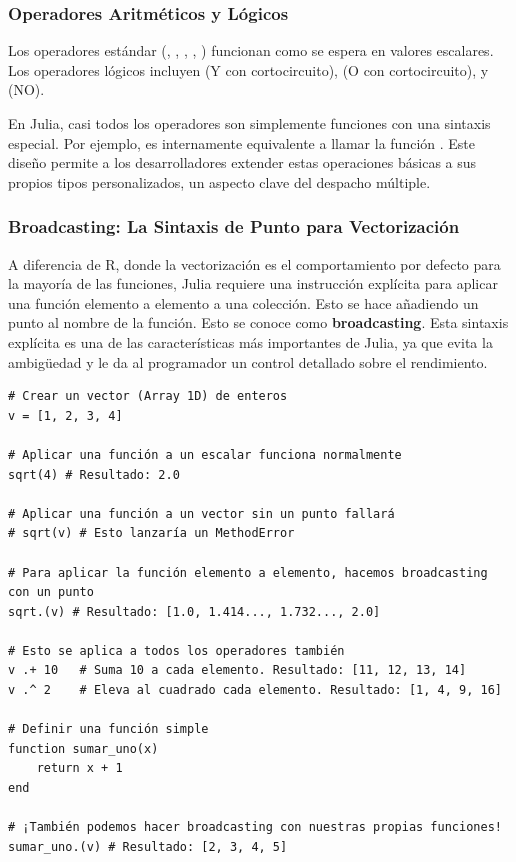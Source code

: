 \subsubsection*{Operadores Aritméticos y Lógicos}
Los operadores estándar (\jcode{+}, \jcode{-}, \jcode{*}, \jcode{/}, \jcode{^}) funcionan como se espera en valores escalares. Los operadores lógicos incluyen \jcode{&&} (Y con cortocircuito), \jcode{||} (O con cortocircuito), y \jcode{!} (NO).

\begin{remark}
En Julia, casi todos los operadores son simplemente funciones con una sintaxis especial. Por ejemplo,  es internamente equivalente a llamar la función . Este diseño permite a los desarrolladores extender estas operaciones básicas a sus propios tipos personalizados, un aspecto clave del despacho múltiple.
\end{remark}

\subsubsection*{Broadcasting: La Sintaxis de Punto para Vectorización}
A diferencia de R, donde la vectorización es el comportamiento por defecto para la mayoría de las funciones, Julia requiere una instrucción explícita para aplicar una función elemento a elemento a una colección. Esto se hace añadiendo un punto  al nombre de la función. Esto se conoce como \textbf{broadcasting}. Esta sintaxis explícita es una de las características más importantes de Julia, ya que evita la ambigüedad y le da al programador un control detallado sobre el rendimiento.

\begin{example}
\text{ }\begin{verbatim}
# Crear un vector (Array 1D) de enteros
v = [1, 2, 3, 4]

# Aplicar una función a un escalar funciona normalmente
sqrt(4) # Resultado: 2.0

# Aplicar una función a un vector sin un punto fallará
# sqrt(v) # Esto lanzaría un MethodError

# Para aplicar la función elemento a elemento, hacemos broadcasting con un punto
sqrt.(v) # Resultado: [1.0, 1.414..., 1.732..., 2.0]

# Esto se aplica a todos los operadores también
v .+ 10   # Suma 10 a cada elemento. Resultado: [11, 12, 13, 14]
v .^ 2    # Eleva al cuadrado cada elemento. Resultado: [1, 4, 9, 16]

# Definir una función simple
function sumar_uno(x)
    return x + 1
end

# ¡También podemos hacer broadcasting con nuestras propias funciones!
sumar_uno.(v) # Resultado: [2, 3, 4, 5]
\end{verbatim}
\end{example}

